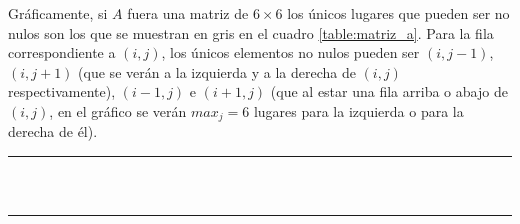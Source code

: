 \documentclass[a4paper]{article}
\begin{document}
Gráficamente, si $A$ fuera una matriz de $6 \times 6$ los únicos lugares que pueden
ser no nulos son los que se muestran en gris en el cuadro \ref{table:matriz_a}. Para la fila 
correspondiente a $(i,j)$, los únicos elementos no nulos pueden ser $(i, j-1)$, 
$(i,j+1)$ (que se verán a la izquierda y a la derecha de $(i,j)$ respectivamente), 
$(i-1, j)$ e $(i+1,j)$ (que al estar una fila arriba o abajo de $(i,j)$, 
en el gráfico se verán $max_j = 6$ lugares para la izquierda o para la derecha de él). 

\newpage
\begin{table}
\centering
\begin{tabular}{|l|l|l|l|l|l|l|l|l|l|l|l|l|l|l|l|l|l|l|l|l|l|l|l|l|l|l|l|l|l|l|l|l|l|l|l|}
\hline
 & & & & & & & & & & & & & & & & & & & & & & & & & & & & & & & & & & & \\ \hline 
 & & & & & & & & & & & & & & & & & & & & & & & & & & & & & & & & & & & \\ \hline 
 & & & & & & & & & & & & & & & & & & & & & & & & & & & & & & & & & & & \\ \hline 
 & & & & & & & & & & & & & & & & & & & & & & & & & & & & & & & & & & & \\ \hline 
 & & & & & & & & & & & & & & & & & & & & & & & & & & & & & & & & & & & \\ \hline 
 & & & & & & & & & & & & & & & & & & & & & & & & & & & & & & & & & & & \\ \hline 
 & & & & & & & & & & & & & & & & & & & & & & & & & & & & & & & & & & & \\ \hline 
 & \cellcolor{mygray} & & & & & \cellcolor{mygray} & \cellcolor{mygray} & \cellcolor{mygray} & & & & & \cellcolor{mygray} & & & & & & & & & & & & & & & & & & & & & & \\ \hline 
 & & \cellcolor{mygray} & & & & & \cellcolor{mygray} & \cellcolor{mygray} & \cellcolor{mygray} & & & & & \cellcolor{mygray} & & & & & & & & & & & & & & & & & & & & & \\ \hline 
 & & & \cellcolor{mygray} & & & & & \cellcolor{mygray} & \cellcolor{mygray} & \cellcolor{mygray} & & & & & \cellcolor{mygray} & & & & & & & & & & & & & & & & & & & & \\ \hline 
 & & & & \cellcolor{mygray} & & & & & \cellcolor{mygray} & \cellcolor{mygray} & \cellcolor{mygray} & & & & & \cellcolor{mygray} & & & & & & & & & & & & & & & & & & & \\ \hline 
 & & & & & & & & & & & & & & & & & & & & & & & & & & & & & & & & & & & \\ \hline 

\end{tabular}
\end{table}
\end{document}
